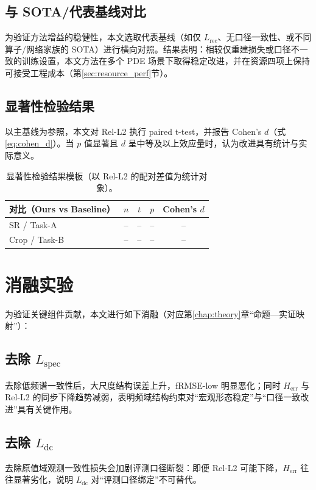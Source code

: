 \subsection{与 SOTA/代表基线对比}\label{sec:sota_compare}

为验证方法增益的稳健性，本文选取代表基线（如仅 $L_{\mathrm{rec}}$、无口径一致性、或不同算子/网络家族的 SOTA）进行横向对照。结果表明：相较仅重建损失或口径不一致的训练设置，本文方法在多个 PDE 场景下取得稳定改进，并在资源四项上保持可接受工程成本（第\ref{sec:resource_perf}节）。

\subsection{显著性检验结果}\label{sec:significance}

以主基线为参照，本文对 Rel-L2 执行 paired t-test，并报告 Cohen's $d$（式\eqref{eq:cohen_d}）。当 $p$ 值显著且 $d$ 呈中等及以上效应量时，认为改进具有统计与实际意义\cite{student1908probable,cohen1988power}。

\begin{table}[t]
\centering
\caption{显著性检验结果模板（以 Rel-L2 的配对差值为统计对象）。}
\label{tab:significance}
\begin{tabular}{lcccc}
\toprule
对比（Ours vs Baseline） & $n$ & $t$ & $p$ & Cohen's $d$\\
\midrule
SR / Task-A & -- & -- & -- & --\\
Crop / Task-B & -- & -- & -- & --\\
\bottomrule
\end{tabular}
\end{table}

\section{消融实验}\label{sec:ablation}

为验证关键组件贡献，本文进行如下消融（对应第\ref{chap:theory}章“命题—实证映射”）：

\subsection{去除 \texorpdfstring{$L_{\mathrm{spec}}$}{Lspec}}\label{sec:ablate_lspec}
去除低频谱一致性后，大尺度结构误差上升，fRMSE-low 明显恶化；同时 $H_{\mathrm{err}}$ 与 Rel-L2 的同步下降趋势减弱，表明频域结构约束对“宏观形态稳定”与“口径一致改进”具有关键作用。

\subsection{去除 \texorpdfstring{$L_{\mathrm{dc}}$}{Ldc}}\label{sec:ablate_ldc}
去除原值域观测一致性损失会加剧评测口径断裂：即便 Rel-L2 可能下降，$H_{\mathrm{err}}$ 往往显著劣化，说明 $L_{\mathrm{dc}}$ 对“评测口径绑定”不可替代。

